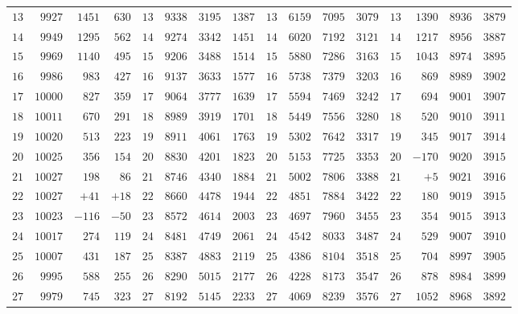 \begin{GaussVISolarFrame}
\begin{tabular}{r|r|r|r||r|r|r|r||r|r|r|r||r|r|r|r}
$13$ & $9927$ & $1451$ & $630$ & $13$ & $9338$ & $3195$ & $1387$ & $13$ & $6159$ & $7095$ & $3079$ & $13$ & $1390$ & $8936$ & $3879$\\
$14$ & $9949$ & $1295$ & $562$ & $14$ & $9274$ & $3342$ & $1451$ & $14$ & $6020$ & $7192$ & $3121$ & $14$ & $1217$ & $8956$ & $3887$\\
$15$ & $9969$ & $1140$ & $495$ & $15$ & $9206$ & $3488$ & $1514$ & $15$ & $5880$ & $7286$ & $3163$ & $15$ & $1043$ & $8974$ & $3895$\\[3pt]
$16$ & $9986$ & $983$ & $427$ & $16$ & $9137$ & $3633$ & $1577$ & $16$ & $5738$ & $7379$ & $3203$ & $16$ & $869$ & $8989$ & $3902$\\
$17$ & $10000$ & $827$ & $359$ & $17$ & $9064$ & $3777$ & $1639$ & $17$ & $5594$ & $7469$ & $3242$ & $17$ & $694$ & $9001$ & $3907$\\
$18$ & $10011$ & $670$ & $291$ & $18$ & $8989$ & $3919$ & $1701$ & $18$ & $5449$ & $7556$ & $3280$ & $18$ & $520$ & $9010$ & $3911$\\
$19$ & $10020$ & $513$ & $223$ & $19$ & $8911$ & $4061$ & $1763$ & $19$ & $5302$ & $7642$ & $3317$ & $19$ & $345$ & $9017$ & $3914$\\
$20$ & $10025$ & $356$ & $154$ & $20$ & $8830$ & $4201$ & $1823$ & $20$ & $5153$ & $7725$ & $3353$ & $20$ & $-170$ & $9020$ & $3915$\\[3pt]
$21$ & $10027$ & $198$ & $86$ & $21$ & $8746$ & $4340$ & $1884$ & $21$ & $5002$ & $7806$ & $3388$ & $21$ & $+5$ & $9021$ & $3916$\\
$22$ & $10027$ & $+41$ & $+18$ & $22$ & $8660$ & $4478$ & $1944$ & $22$ & $4851$ & $7884$ & $3422$ & $22$ & $180$ & $9019$ & $3915$\\
$23$ & $10023$ & $-116$ & $-50$ & $23$ & $8572$ & $4614$ & $2003$ & $23$ & $4697$ & $7960$ & $3455$ & $23$ & $354$ & $9015$ & $3913$\\
$24$ & $10017$ & $274$ & $119$ & $24$ & $8481$ & $4749$ & $2061$ & $24$ & $4542$ & $8033$ & $3487$ & $24$ & $529$ & $9007$ & $3910$\\
$25$ & $10007$ & $431$ & $187$ & $25$ & $8387$ & $4883$ & $2119$ & $25$ & $4386$ & $8104$ & $3518$ & $25$ & $704$ & $8997$ & $3905$\\[3pt]
$26$ & $9995$ & $588$ & $255$ & $26$ & $8290$ & $5015$ & $2177$ & $26$ & $4228$ & $8173$ & $3547$ & $26$ & $878$ & $8984$ & $3899$\\
$27$ & $9979$ & $745$ & $323$ & $27$ & $8192$ & $5145$ & $2233$ & $27$ & $4069$ & $8239$ & $3576$ & $27$ & $1052$ & $8968$ & $3892$\\

\end{tabular}
\end{GaussVISolarFrame}
